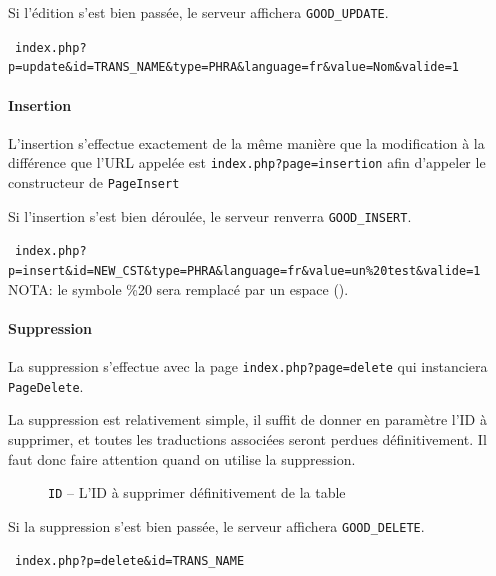         Si l'édition s'est bien passée, le serveur affichera \texttt{GOOD\_UPDATE}.
                    \begin{exemple}
                ~\texttt{index.php?p=update\&id=TRANS\_NAME\&type=PHRA\&language=fr\&value=Nom\&valide=1}\\
            \end{exemple}
        \paragraph{Insertion}
        L'insertion s'effectue exactement de la même manière que la modification à la différence que l'URL appelée est \texttt{index.php?page=insertion} afin d'appeler le constructeur de \texttt{PageInsert}

        Si l'insertion s'est bien déroulée, le serveur renverra \texttt{GOOD\_INSERT}.

                    \begin{exemple}
                ~\texttt{index.php?p=insert\&id=NEW\_CST\&type=PHRA\&language=fr\&value=un\%20test\&valide=1}\\

                NOTA: le symbole \%20 sera remplacé par un espace (\vs{}).
            \end{exemple}

        \paragraph{Suppression}
         La suppression s'effectue avec la page \texttt{index.php?page=delete} qui instanciera \texttt{PageDelete}.

         La suppression est relativement simple, il suffit de donner en paramètre l'ID à supprimer, et toutes les traductions associées seront perdues définitivement. Il faut donc faire attention quand on utilise la suppression.

        \begin{description}
            \item[] \texttt{ID} -- L'ID à supprimer définitivement de la table
        \end{description}

        Si la suppression s'est bien passée, le serveur affichera \texttt{GOOD\_DELETE}.
                    \begin{exemple}
                ~\texttt{index.php?p=delete\&id=TRANS\_NAME}\\
            \end{exemple}

